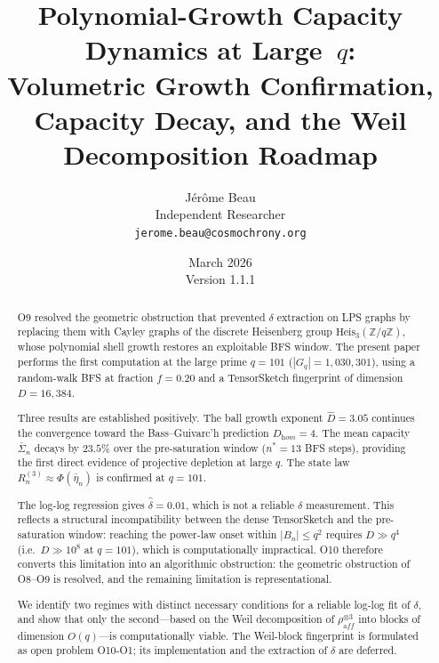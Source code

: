 \documentclass[11pt,a4paper]{article}
\newcommand{\Heis}{\mathrm{Heis}_3(\mathbb{Z}/q\mathbb{Z})}
\newcommand{\Dhat}{\hat{D}}
\newcommand{\delt}{\hat{\delta}}
\begin{document}
  \title{Polynomial-Growth Capacity Dynamics at Large~$q$:\\
  Volumetric Growth Confirmation, Capacity Decay, and the Weil Decomposition Roadmap}

  \author{J\'er\^ome Beau\\
  \small Independent Researcher\\
  \small \texttt{jerome.beau@cosmochrony.org}}

  \date{March 2026\\[2pt]\small Version 1.1.1}

  \maketitle

  \begin{abstract}
    O9 resolved the geometric obstruction that prevented $\delta$ extraction
    on LPS graphs by replacing them with Cayley graphs of the discrete
    Heisenberg group $\Heis$, whose polynomial shell growth restores
    an exploitable BFS window.
    The present paper performs the first computation at the large prime
    $q = 101$ ($|G_q| = 1{,}030{,}301$), using a random-walk BFS at fraction
    $f = 0.20$ and a TensorSketch fingerprint of dimension $D = 16{,}384$.

    Three results are established positively.
    The ball growth exponent $\Dhat = 3.05$ continues the convergence toward
    the Bass--Guivarc'h prediction $D_{\mathrm hom} = 4$.
    The mean capacity $\bar\Sigma_n$ decays by $23.5\%$ over the pre-saturation
    window ($n^* = 13$ BFS steps), providing the first direct evidence of
    projective depletion at large $q$.
    The state law $R_n^{(3)} \approx \Phi(\bar\eta_n)$ is confirmed at $q = 101$.

    The log-log regression gives $\delt = 0.01$, which is not a reliable
    $\delta$ measurement.
    This reflects a structural incompatibility between the dense TensorSketch
    and the pre-saturation window: reaching the power-law onset within
    $|B_n| \leq q^2$ requires $D \gg q^4$ (i.e.\ $D \gg 10^8$ at $q = 101$),
    which is computationally impractical.
    O10 therefore converts this limitation into an algorithmic obstruction:
    the geometric obstruction of O8--O9 is resolved, and the remaining
    limitation is representational.

    We identify two regimes with distinct necessary conditions for a reliable
    log-log fit of $\delta$, and show that only the second---based on the
    Weil decomposition of $\rho_{\mathrm aff}^{\otimes 3}$ into blocks of
    dimension $O(q)$---is computationally viable.
    The Weil-block fingerprint is formulated as open problem O10-O1;
    its implementation and the extraction of $\delta$ are deferred.
  \end{abstract}
\end{document}

